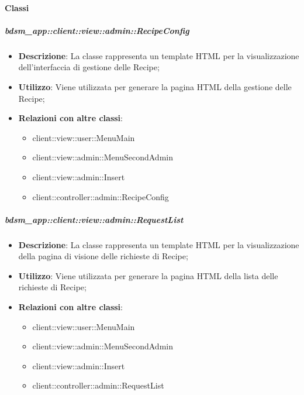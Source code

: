 	\paragraph{Classi} %
		\subparagraph{bdsm\_app::client::view::admin::RecipeConfig} %
		\label{subp:bdsm_app_client_view_admin_recipeconfig}
			\begin{itemize}
				\item \textbf{Descrizione}: La classe rappresenta un template HTML per la visualizzazione dell'interfaccia di gestione delle Recipe;
				\item \textbf{Utilizzo}: Viene utilizzata per generare la pagina HTML della gestione delle Recipe;
				\item \textbf{Relazioni con altre classi}: 		
					\begin{itemize}
						\item client::view::user::MenuMain
						\item client::view::admin::MenuSecondAdmin
						\item client::view::admin::Insert
						\item client::controller::admin::RecipeConfig
					\end{itemize}
			\end{itemize}

		\subparagraph{bdsm\_app::client::view::admin::RequestList} %
		\label{subp:bdsm_app_client_view_admin_requestlist}
			\begin{itemize}
				\item \textbf{Descrizione}: La classe rappresenta un template HTML per la visualizzazione della pagina di visione delle richieste di Recipe;
				\item \textbf{Utilizzo}: Viene utilizzata per generare la pagina HTML della lista delle richieste di Recipe;
				\item \textbf{Relazioni con altre classi}: 		
					\begin{itemize}
						\item client::view::user::MenuMain
						\item client::view::admin::MenuSecondAdmin
						\item client::view::admin::Insert
						\item client::controller::admin::RequestList
					\end{itemize}
			\end{itemize}


